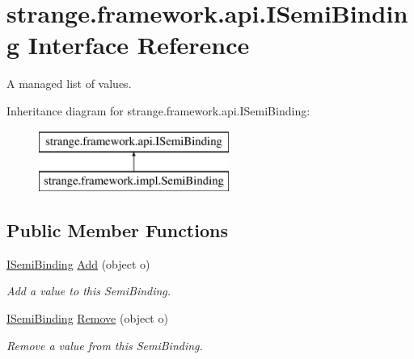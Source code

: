 \hypertarget{interfacestrange_1_1framework_1_1api_1_1_i_semi_binding}{\section{strange.\-framework.\-api.\-I\-Semi\-Binding Interface Reference}
\label{interfacestrange_1_1framework_1_1api_1_1_i_semi_binding}
}


A managed list of values.  


Inheritance diagram for strange.\-framework.\-api.\-I\-Semi\-Binding\-:\begin{figure}[H]
\begin{center}
\leavevmode
\includegraphics[height=2.000000cm]{interfacestrange_1_1framework_1_1api_1_1_i_semi_binding}
\end{center}
\end{figure}
\subsection*{Public Member Functions}
\begin{DoxyCompactItemize}
\item 
\hypertarget{interfacestrange_1_1framework_1_1api_1_1_i_semi_binding_ad953658df90d8a9e0c999a79d2b3f142}{\hyperlink{interfacestrange_1_1framework_1_1api_1_1_i_semi_binding}{I\-Semi\-Binding} \hyperlink{interfacestrange_1_1framework_1_1api_1_1_i_semi_binding_ad953658df90d8a9e0c999a79d2b3f142}{Add} (object o)}\label{interfacestrange_1_1framework_1_1api_1_1_i_semi_binding_ad953658df90d8a9e0c999a79d2b3f142}

\begin{DoxyCompactList}\small\item\em Add a value to this Semi\-Binding. \end{DoxyCompactList}\item 
\hypertarget{interfacestrange_1_1framework_1_1api_1_1_i_semi_binding_aca4d09c03a80ba98b407ccd4bfad97f6}{\hyperlink{interfacestrange_1_1framework_1_1api_1_1_i_semi_binding}{I\-Semi\-Binding} \hyperlink{interfacestrange_1_1framework_1_1api_1_1_i_semi_binding_aca4d09c03a80ba98b407ccd4bfad97f6}{Remove} (object o)}\label{interfacestrange_1_1framework_1_1api_1_1_i_semi_binding_aca4d09c03a80ba98b407ccd4bfad97f6}

\begin{DoxyCompactList}\small\item\em Remove a value from this Semi\-Binding. \end{DoxyCompactList}\end{DoxyCompactItemize}
